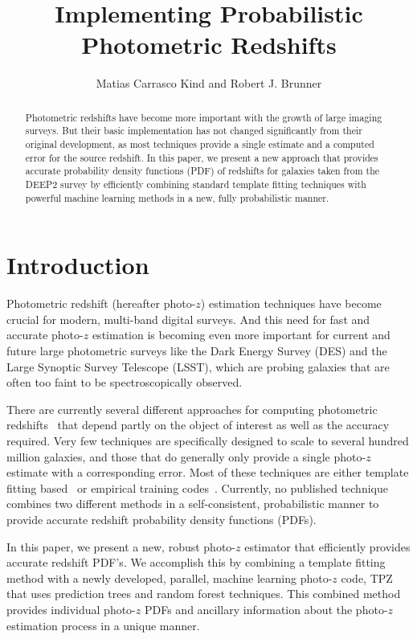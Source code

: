 \documentclass[11pt,twoside]{article}
\begin{document}
\title{Implementing Probabilistic Photometric Redshifts}
\author{Matias Carrasco Kind and Robert J. Brunner
}


\begin{abstract}
Photometric redshifts have become more important with the growth of large imaging surveys. But their basic implementation has not changed significantly from their original development, as most techniques provide a single estimate and a computed error for the source redshift. In this paper, we present a new approach that provides accurate probability density functions (PDF) of redshifts for galaxies taken from the DEEP2 survey  by efficiently combining standard template fitting techniques with powerful machine learning methods in a new, fully probabilistic manner.
\end{abstract}

\section{Introduction}
Photometric redshift (hereafter photo-$z$) estimation techniques have become crucial for modern, multi-band digital surveys. And this need for fast and accurate photo-$z$ estimation is becoming even more important for current and future large photometric surveys like the Dark Energy Survey (DES) and the Large Synoptic Survey Telescope (LSST), which are probing galaxies that are often too faint to be spectroscopically observed. 

There are currently several different approaches for computing photometric redshifts~\citep[see, \textit{ e.g.},][for an updated comparison of current photometric redshift methods and public codes]{Hildebrandt2010,Abdalla2011} that depend partly on the object of interest as well as the accuracy required. Very few techniques are specifically designed to scale to several hundred million galaxies, and those that do generally only provide a single photo-$z$ estimate with a corresponding error. Most of these techniques are either template fitting based~\citep[\textit{e.g.,}][]{Benitez2000} or empirical training codes~\citep[\textit{e.g.,}][]{Carrasco2013}. Currently, no published technique combines two different methods in a self-consistent, probabilistic manner to provide accurate redshift probability density functions (PDFs).

In this paper, we present a new, robust photo-$z$ estimator that efficiently provides accurate redshift PDF's. We accomplish this by combining a template fitting method with a newly developed, parallel, machine learning photo-$z$ code, TPZ~\citep{Carrasco2013} that uses prediction trees and random forest techniques. This combined method provides individual photo-$z$ PDFs and ancillary information about the photo-$z$ estimation process in a unique manner.
\end{document}
